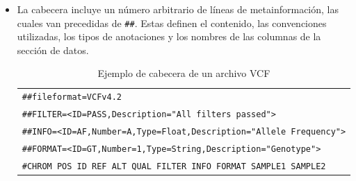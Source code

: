 \documentclass[11pt,spanish,listoffigures,listoftables]{tfgetsinf}
\begin{document}
\begin{itemize}
   \item La cabecera incluye un número arbitrario de líneas de metainformación, las cuales van precedidas de \texttt{\#\#}. Estas definen el contenido, las convenciones utilizadas, los tipos de anotaciones y los nombres de las columnas de la sección de datos\cite{DAN}.
      \begin{table}[H]
         \centering
         \caption{Ejemplo de cabecera de un archivo VCF}
         \begin{tabular}{|l|}
         \hline
         \texttt{\#\#fileformat=VCFv4.2} \\
         \texttt{\#\#FILTER=<ID=PASS,Description="All filters passed">} \\
         \texttt{\#\#INFO=<ID=AF,Number=A,Type=Float,Description="Allele Frequency">} \\
         \texttt{\#\#FORMAT=<ID=GT,Number=1,Type=String,Description="Genotype">} \\
         \texttt{\#CHROM POS ID REF ALT QUAL FILTER INFO FORMAT SAMPLE1 SAMPLE2} \\
         \hline
         \end{tabular}
         \label{tabla:cabeceraVCF}
      \end{table}
      

\end{itemize}
\end{document}
